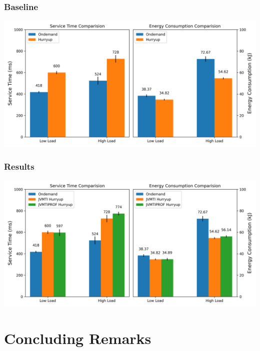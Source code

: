 \documentclass{beamer}
\begin{document}
\begin{frame}
\frametitle{Baseline}
\includegraphics[width=1.0\textwidth]{src/figure/ondem_vs_hup.png}
\end{frame}

\begin{frame}
\frametitle{Results}
\includegraphics[width=1.0\textwidth]{src/figure/ondem_vs_hup_vs_newhup.png}
\end{frame}

\section{Concluding Remarks}
\end{document}
